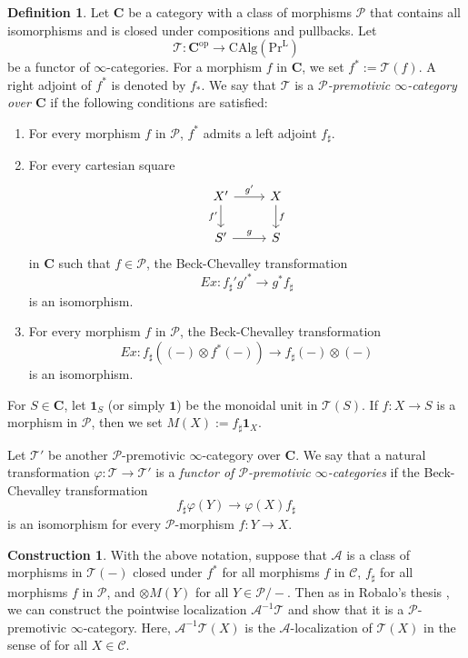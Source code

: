 \documentclass[10pt]{amsart}
\theoremstyle{definition}
\newtheorem{df}[thm]{Definition}
\newtheorem{const}[thm]{Construction}
\theoremstyle{remark}
\numberwithin{equation}{subsection}
\newcommand{\bC}{\mathbf{C}}
\newcommand{\cA}{\mathcal{A}}
\newcommand{\cC}{\mathcal{C}}
\newcommand{\cP}{\mathcal{P}}
\newcommand{\sT}{\mathscr{T}}
\newcommand{\CAlg}{\mathrm{CAlg}}
\newcommand{\PrL}{\mathrm{Pr}^{\mathrm{L}}}
\newcommand{\op}{\mathrm{op}}
\newcommand{\unit}{\mathbf{1}}
\begin{document}
\begin{df}
\label{shv.7}
Let $\bC$ be a category with a class of morphisms $\cP$ that contains all isomorphisms and is closed under compositions and pullbacks.
Let
\[
\sT
\colon
\bC^{\op}
\to
\CAlg(\PrL)
\]
be a functor of $\infty$-categories.
For a morphism $f$ in $\bC$, we set $f^*:=\sT(f)$.
A right adjoint of $f^*$ is denoted by $f_*$.
We say that $\sT$ is a \emph{$\cP$-premotivic $\infty$-category over $\bC$} if the following conditions are satisfied:
\begin{enumerate}
\item[(i)]
For every morphism $f$ in $\cP$, $f^*$ admits a left adjoint $f_\sharp$.
\item[(ii)]
For every cartesian square
\[
\begin{tikzcd}
X'\ar[r,"g'"]\ar[d,"f'"']&
X\ar[d,"f"]
\\
S'\ar[r,"g"]&
S
\end{tikzcd}
\]
in $\bC$ such that $f\in \cP$, the Beck-Chevalley transformation
\[
Ex\colon f_\sharp' g'^* \to g^*f_\sharp
\]
is an isomorphism.
\item[(iii)] For every morphism $f$ in $\cP$, the Beck-Chevalley transformation
\[
Ex\colon
f_\sharp((-)\otimes f^*(-))
\to
f_\sharp (-) \otimes (-)
\]
is an isomorphism.
\end{enumerate}
For $S\in \bC$, let $\unit_S$ (or simply $\unit$) be the monoidal unit in $\sT(S)$.
If $f\colon X\to S$ is a morphism in $\cP$, then we set $M(X):=f_\sharp \unit_X$.

Let $\sT'$ be another $\cP$-premotivic $\infty$-category over $\bC$.
We say that a natural transformation $\varphi\colon \sT\to \sT'$ is a \emph{functor of $\cP$-premotivic $\infty$-categories} if the Beck-Chevalley transformation
\[
f_\sharp \varphi(Y)
\to
\varphi(X) f_\sharp
\]
is an isomorphism for every $\cP$-morphism $f\colon Y\to X$.
\end{df}


\begin{const}
\label{shv.8}
With the above notation, suppose that $\cA$ is a class of morphisms in $\sT(-)$ closed under $f^*$ for all morphisms $f$ in $\cC$, $f_\sharp$ for all morphisms $f$ in $\cP$, and $\otimes M(Y)$ for all $Y\in \cP/-$.
Then as in Robalo's thesis \cite[\S 9.1]{Robalothesis}, we can construct the pointwise localization $\cA^{-1}\sT$ and show that it is a $\cP$-premotivic $\infty$-category.
Here, $\cA^{-1}\sT(X)$ is the $\cA$-localization of $\sT(X)$ in the sense of \cite[\S 5.5.4]{HTT} for all $X\in \cC$.
\end{const}
\end{document}
